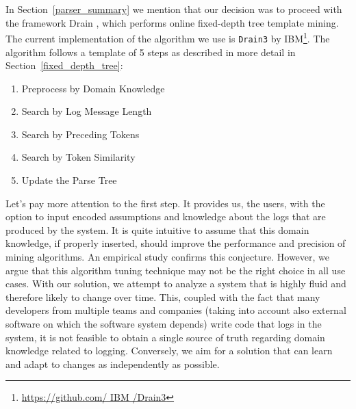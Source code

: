  \begin{figure}[!h] 
\end{figure}

In Section~\ref{parser_summary} we mention that our decision was to proceed with the framework Drain \cite{drain2017}, which performs online fixed-depth tree template mining. The current implementation of the algorithm we use is \texttt{Drain3} by IBM\footnote{\url{https://github.com/ IBM /Drain3}}. The algorithm follows a template of 5 steps as described in more detail in Section~\ref{fixed_depth_tree}:
\begin{enumerate}
    \item Preprocess by Domain Knowledge
    \item Search by Log Message Length
    \item Search by Preceding Tokens
    \item Search by Token Similarity
    \item Update the Parse Tree
\end{enumerate}

Let's pay more attention to the first step. It provides us, the users, with the option to input encoded assumptions and knowledge about the logs that are produced by the system.
It is quite intuitive to assume that this domain knowledge, if properly inserted, should improve the performance and precision of mining algorithms. An empirical study \cite{he2016} confirms this conjecture.
However, we argue that this algorithm tuning technique may not be the right choice in all use cases. With our solution, we attempt to analyze a system that is highly fluid and therefore likely to change over time. This, coupled with the fact that many developers from multiple teams and companies (taking into account also external software on which the software system depends) write code that logs in the system, it is not feasible to obtain a single source of truth regarding domain knowledge related to logging. Conversely, we aim for a solution that can learn and adapt to changes as independently as possible.\\

